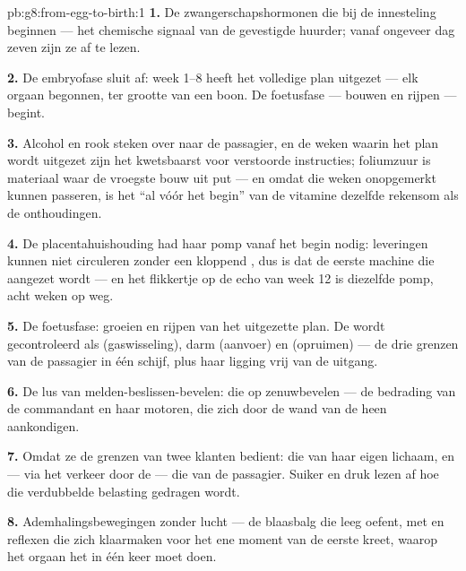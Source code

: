 \begin{solution}{pb:g8:from-egg-to-birth:1}
\textbf{1.} De zwangerschapshormonen die bij de innesteling beginnen ---
het chemische signaal van de gevestigde huurder; vanaf ongeveer dag zeven
zijn ze af te lezen.

\textbf{2.} De embryofase sluit af: week 1--8 heeft het volledige plan
uitgezet --- elk orgaan begonnen, ter grootte van een boon. De foetusfase
--- bouwen en rijpen --- begint.

\textbf{3.} Alcohol en rook steken over naar de passagier, en de weken
waarin het plan wordt uitgezet zijn het kwetsbaarst voor verstoorde
instructies; foliumzuur is materiaal waar de vroegste bouw uit put --- en
omdat die weken onopgemerkt kunnen passeren, is het ``al vóór het begin''
van de vitamine dezelfde rekensom als de onthoudingen.

\textbf{4.} De placentahuishouding had haar pomp vanaf het begin nodig:
leveringen kunnen niet circuleren zonder een kloppend , dus is dat de
eerste machine die aangezet wordt --- en het flikkertje op de echo van
week 12 is diezelfde pomp, acht weken op weg.

\textbf{5.} De foetusfase: groeien en rijpen van het uitgezette plan. De
 wordt gecontroleerd als  (gaswisseling), darm (aanvoer) en
 (opruimen) --- de drie grenzen van de passagier in één schijf, plus
haar ligging vrij van de uitgang.

\textbf{6.} De lus van melden-beslissen-bevelen:  die op
zenuwbevelen  --- de bedrading van de commandant en haar
motoren, die zich door de wand van de  heen aankondigen.

\textbf{7.} Omdat ze de grenzen van twee klanten bedient: die van haar
eigen lichaam, en --- via het verkeer door de  --- die van de
passagier. Suiker en druk lezen af hoe die verdubbelde belasting gedragen
wordt.

\textbf{8.} Ademhalingsbewegingen zonder lucht --- de blaasbalg die leeg
oefent, met  en reflexen die zich klaarmaken voor het ene moment
van de eerste kreet, waarop het orgaan het in één keer moet doen.


\end{solution}
